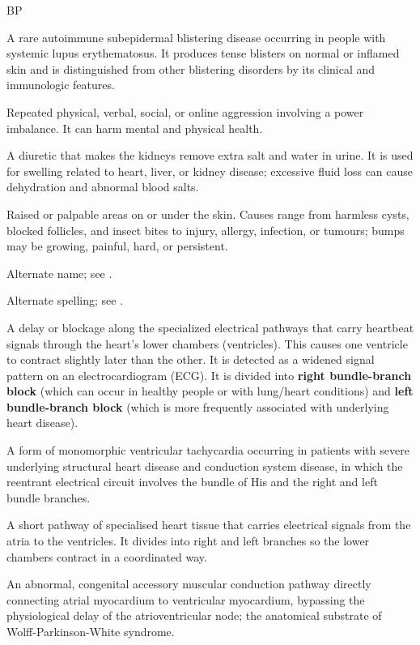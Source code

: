 \synonyms
BP

 A rare autoimmune subepidermal blistering disease occurring in people with systemic lupus erythematosus. It produces tense blisters on normal or inflamed skin and is distinguished from other blistering disorders by its clinical and immunologic features.

 Repeated physical, verbal, social, or online aggression involving a power imbalance. It can harm mental and physical health.

 A diuretic that makes the kidneys remove extra salt and water in urine. It is used for swelling related to heart, liver, or kidney disease; excessive fluid loss can cause dehydration and abnormal blood salts.

 Raised or palpable areas on or under the skin. Causes range from harmless cysts, blocked follicles, and insect bites to injury, allergy, infection, or tumours; bumps may be growing, painful, hard, or persistent.

 Alternate name; see .

 Alternate spelling; see .

 A delay or blockage along the specialized electrical pathways that carry heartbeat signals through the heart's lower chambers (ventricles). This causes one ventricle to contract slightly later than the other. It is detected as a widened signal pattern on an electrocardiogram (ECG). It is divided into \textbf{right bundle-branch block} (which can occur in healthy people or with lung/heart conditions) and \textbf{left bundle-branch block} (which is more frequently associated with underlying heart disease).

 A form of monomorphic ventricular tachycardia occurring in patients with severe underlying structural heart disease and conduction system disease, in which the reentrant electrical circuit involves the bundle of His and the right and left bundle branches.

 A short pathway of specialised heart tissue that carries electrical signals from the atria to the ventricles. It divides into right and left branches so the lower chambers contract in a coordinated way.

 An abnormal, congenital accessory muscular conduction pathway directly connecting atrial myocardium to ventricular myocardium, bypassing the physiological delay of the atrioventricular node; the anatomical substrate of Wolff-Parkinson-White syndrome.

